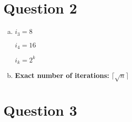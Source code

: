 \documentclass[12pt]{article}
\begin{document}
\section*{Question 2}
\begin{enumerate}[a.]
    \item

    $i_3 = 8$

    $i_4 = 16$

    $i_k = 2^k$

    \item

    \textbf{Exact number of iterations:} $\lceil \sqrt{n} \rceil$

\end{enumerate}

\section*{Question 3}
\end{document}
